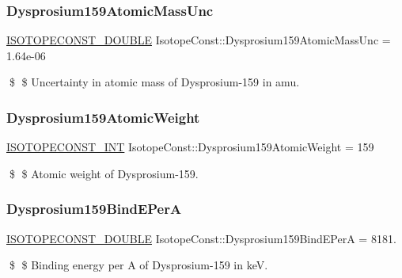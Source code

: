 \subsubsection{\texorpdfstring{Dysprosium159\+Atomic\+Mass\+Unc}{Dysprosium159AtomicMassUnc}}
{\footnotesize\ttfamily \mbox{\hyperlink{group___isotope_const-_macros_ga8f45a7272ce02c0b4c65c44636ed719a}{I\+S\+O\+T\+O\+P\+E\+C\+O\+N\+S\+T\+\_\+\+D\+O\+U\+B\+LE}} Isotope\+Const\+::\+Dysprosium159\+Atomic\+Mass\+Unc = 1.\+64e-\/06}

\$ \$ Uncertainty in atomic mass of Dysprosium-\/159 in amu. \mbox{\label{group___isotope_const-_dysprosium-_dy159_gaff8aedd9603ccb3895768f79e5c68c56}} 
\subsubsection{\texorpdfstring{Dysprosium159\+Atomic\+Weight}{Dysprosium159AtomicWeight}}
{\footnotesize\ttfamily \mbox{\hyperlink{group___isotope_const-_macros_ga5f18360b3e99483a35c32d789e62621c}{I\+S\+O\+T\+O\+P\+E\+C\+O\+N\+S\+T\+\_\+\+I\+NT}} Isotope\+Const\+::\+Dysprosium159\+Atomic\+Weight = 159}

\$ \$ Atomic weight of Dysprosium-\/159. \mbox{\label{group___isotope_const-_dysprosium-_dy159_gab0f14cf30b8ea14ab2d30cb9a9eb6158}} 
\subsubsection{\texorpdfstring{Dysprosium159\+Bind\+E\+PerA}{Dysprosium159BindEPerA}}
{\footnotesize\ttfamily \mbox{\hyperlink{group___isotope_const-_macros_ga8f45a7272ce02c0b4c65c44636ed719a}{I\+S\+O\+T\+O\+P\+E\+C\+O\+N\+S\+T\+\_\+\+D\+O\+U\+B\+LE}} Isotope\+Const\+::\+Dysprosium159\+Bind\+E\+PerA = 8181.}

\$ \$ Binding energy per A of Dysprosium-\/159 in keV. \mbox{\label{group___isotope_const-_dysprosium-_dy159_ga3043d803ec7ffc88c2d6643f876a777d}} 
